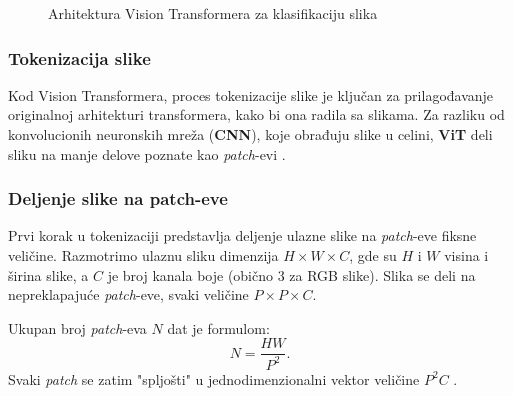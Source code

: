 \documentclass[12pt]{article}
\begin{document}
   \begin{figure}[h!]
      \centering
      \vspace{1cm} %
      \caption{Arhitektura Vision Transformera za klasifikaciju slika}
      \label{fig:vit_architecture}
   \end{figure}
   \newpage

   \subsubsection{Tokenizacija slike}
   Kod Vision Transformera, proces tokenizacije slike je ključan za prilagođavanje originalnoj arhitekturi 
   transformera, kako bi ona radila sa slikama. Za razliku od konvolucionih neuronskih mreža 
   (\textbf{CNN}), koje obrađuju slike u celini, \textbf{ViT} deli sliku na manje 
   delove poznate kao \textit{patch}-evi \cite{vit}.
   
   \subsubsection*{Deljenje slike na patch-eve}
   Prvi korak u tokenizaciji predstavlja deljenje ulazne slike na \textit{patch}-eve fiksne veličine. 
   Razmotrimo ulaznu sliku dimenzija \( H \times W \times C \), 
   gde su \( H \) i \( W \) visina i širina slike, a \( C \) je broj 
   kanala boje (obično 3 za RGB slike). Slika se deli na nepreklapajuće \textit{patch}-eve, 
   svaki veličine \( P \times P \times C \).
   
   Ukupan broj \textit{patch}-eva \( N \) dat je formulom:
   \[
   N = \frac{HW}{P^2}.
   \]
   Svaki \textit{patch} se zatim "spljošti" u jednodimenzionalni vektor 
   veličine \( P^2C \) \cite{vit_impl}.
   
\end{document}
